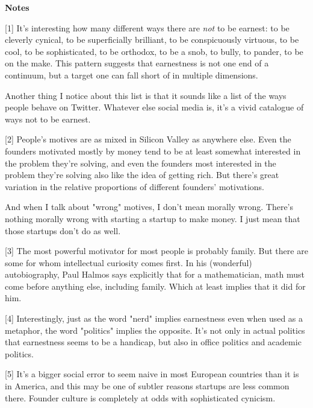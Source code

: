 \textbf{Notes}

[1] It's interesting how many different ways there are
                  \emph{not} to be earnest: to be cleverly cynical, to be
                  superficially brilliant, to be conspicuously virtuous, to be
                  cool, to be sophisticated, to be orthodox, to be a snob, to
                  bully, to pander, to be on the make. This pattern suggests
                  that earnestness is not one end of a continuum, but a target
                  one can fall short of in multiple dimensions.

Another
                  thing I notice about this list is that it sounds like a list
                  of the ways people behave on Twitter. Whatever else social
                  media is, it's a vivid catalogue of ways not to be earnest.

[2] People's motives are as mixed in Silicon Valley as anywhere
                  else. Even the founders motivated mostly by money tend to be
                  at least somewhat interested in the problem they're solving,
                  and even the founders most interested in the problem they're
                  solving also like the idea of getting rich. But there's great
                  variation in the relative proportions of different founders'
                  motivations.

And when I talk about "wrong" motives,
                  I don't mean morally wrong. There's nothing morally wrong with
                  starting a startup to make money. I just mean that those
                  startups don't do as well.

[3] The most powerful motivator for most people is probably
                  family. But there are some for whom intellectual curiosity
                  comes first. In his (wonderful) autobiography, Paul Halmos
                  says explicitly that for a mathematician, math must come
                  before anything else, including family. Which at least implies
                  that it did for him.

[4] Interestingly, just as the word "nerd" implies earnestness
                  even when used as a metaphor, the word "politics" implies the
                  opposite. It's not only in actual politics that earnestness
                  seems to be a handicap, but also in office politics and
                  academic politics.

[5] It's a bigger social error to seem naive in most European
                  countries than it is in America, and this may be one of
                  subtler reasons startups are less common there. Founder
                  culture is completely at odds with sophisticated cynicism.

